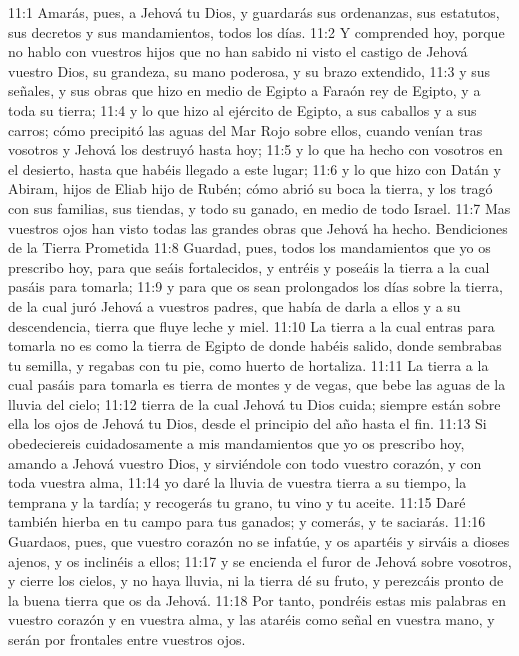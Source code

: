 11:1 Amarás, pues, a Jehová tu Dios, y guardarás sus ordenanzas, sus estatutos, sus decretos y sus mandamientos, todos los días.  
11:2 Y comprended hoy, porque no hablo con vuestros hijos que no han sabido ni visto el castigo de Jehová vuestro Dios, su grandeza, su mano poderosa, y su brazo extendido,  
11:3 y sus señales, y sus obras que hizo en medio de Egipto a Faraón rey de Egipto, y a toda su tierra;  
11:4 y lo que hizo al ejército de Egipto, a sus caballos y a sus carros; cómo precipitó las aguas del Mar Rojo sobre ellos, cuando venían tras vosotros y Jehová los destruyó hasta hoy;  
11:5 y lo que ha hecho con vosotros en el desierto, hasta que habéis llegado a este lugar;  
11:6 y lo que hizo con Datán y Abiram, hijos de Eliab hijo de Rubén; cómo abrió su boca la tierra, y los tragó con sus familias, sus tiendas, y todo su ganado, en medio de todo Israel.  
11:7 Mas vuestros ojos han visto todas las grandes obras que Jehová ha hecho.  
Bendiciones de la Tierra Prometida  
11:8 Guardad, pues, todos los mandamientos que yo os prescribo hoy, para que seáis fortalecidos, y entréis y poseáis la tierra a la cual pasáis para tomarla;  
11:9 y para que os sean prolongados los días sobre la tierra, de la cual juró Jehová a vuestros padres, que había de darla a ellos y a su descendencia, tierra que fluye leche y miel.  
11:10 La tierra a la cual entras para tomarla no es como la tierra de Egipto de donde habéis salido, donde sembrabas tu semilla, y regabas con tu pie, como huerto de hortaliza.  
11:11 La tierra a la cual pasáis para tomarla es tierra de montes y de vegas, que bebe las aguas de la lluvia del cielo;  
11:12 tierra de la cual Jehová tu Dios cuida; siempre están sobre ella los ojos de Jehová tu Dios, desde el principio del año hasta el fin.  
11:13 Si obedeciereis cuidadosamente a mis mandamientos que yo os prescribo hoy, amando a Jehová vuestro Dios, y sirviéndole con todo vuestro corazón, y con toda vuestra alma,  
11:14 yo daré la lluvia de vuestra tierra a su tiempo, la temprana y la tardía; y recogerás tu grano, tu vino y tu aceite.  
11:15 Daré también hierba en tu campo para tus ganados; y comerás, y te saciarás.  
11:16 Guardaos, pues, que vuestro corazón no se infatúe, y os apartéis y sirváis a dioses ajenos, y os inclinéis a ellos;  
11:17 y se encienda el furor de Jehová sobre vosotros, y cierre los cielos, y no haya lluvia, ni la tierra dé su fruto, y perezcáis pronto de la buena tierra que os da Jehová.  
11:18 Por tanto, pondréis estas mis palabras en vuestro corazón y en vuestra alma, y las ataréis como señal en vuestra mano, y serán por frontales entre vuestros ojos.  

